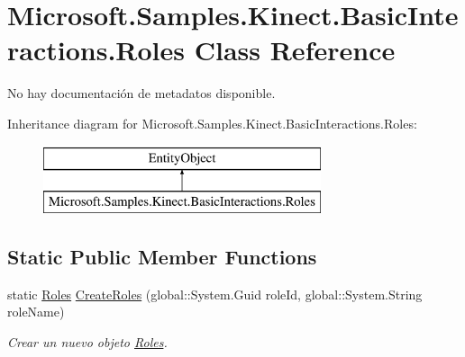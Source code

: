 \hypertarget{class_microsoft_1_1_samples_1_1_kinect_1_1_basic_interactions_1_1_roles}{\section{Microsoft.\-Samples.\-Kinect.\-Basic\-Interactions.\-Roles Class Reference}
\label{class_microsoft_1_1_samples_1_1_kinect_1_1_basic_interactions_1_1_roles}
}


No hay documentación de metadatos disponible.  


Inheritance diagram for Microsoft.\-Samples.\-Kinect.\-Basic\-Interactions.\-Roles\-:\begin{figure}[H]
\begin{center}
\leavevmode
\includegraphics[height=2.000000cm]{class_microsoft_1_1_samples_1_1_kinect_1_1_basic_interactions_1_1_roles}
\end{center}
\end{figure}
\subsection*{Static Public Member Functions}
\begin{DoxyCompactItemize}
\item 
static \hyperlink{class_microsoft_1_1_samples_1_1_kinect_1_1_basic_interactions_1_1_roles}{Roles} \hyperlink{class_microsoft_1_1_samples_1_1_kinect_1_1_basic_interactions_1_1_roles_a1e06bde6b584d8a41ac857b6903aeff3}{Create\-Roles} (global\-::\-System.\-Guid role\-Id, global\-::\-System.\-String role\-Name)
\begin{DoxyCompactList}\small\item\em Crear un nuevo objeto \hyperlink{class_microsoft_1_1_samples_1_1_kinect_1_1_basic_interactions_1_1_roles}{Roles}. \end{DoxyCompactList}\end{DoxyCompactItemize}

